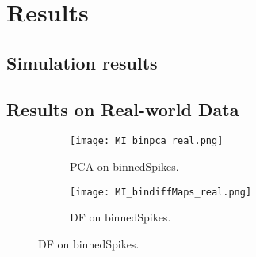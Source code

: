
\section{Results}

\subsection{Simulation results }


%
%
%
%
%
%
%
%
%
%
%



\subsection{Results on Real-world  Data}
\begin{frame}[allowframebreaks]
\begin{figure}
\centering
\begin{subfigure}{.5\textwidth}
\texttt{[image: MI\_binpca\_real.png]}
\caption{PCA on binnedSpikes.}
\end{subfigure}%
\begin{subfigure}{0.5\textwidth}
\texttt{[image: MI\_bindiffMaps\_real.png]}
\caption{DF on binnedSpikes.}
\end{subfigure}
\end{figure}
\end{frame}


